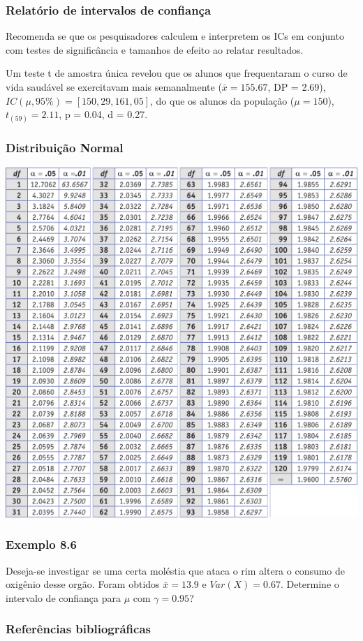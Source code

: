 \documentclass[11pt]{beamer}
\begin{document}
\begin{frame}
\frametitle{Relatório de intervalos de confiança}

Recomenda se que os pesquisadores calculem e interpretem os ICs em conjunto com testes de significância e tamanhos de efeito ao relatar resultados. 

Um teste t de amostra única revelou que os alunos que frequentaram o curso de vida saudável se exercitavam mais semanalmente (\(\bar{x} = 155.67\), DP = 2.69), \(IC(\mu, 95\%)= [150,29, 161,05]\), do que os alunos da população ($\mu = 150$), $t_{(59)} = 2.11$, p = 0.04, d = 0.27.

\end{frame}

\begin{frame}
\frametitle{Distribuição Normal}

\begin{center}\includegraphics[width=0.7\linewidth]{figs/tabela_t} \end{center}
\end{frame}


\begin{frame}
\frametitle{Exemplo 8.6}
Deseja-se investigar se uma certa moléstia que ataca o rim altera o consumo de oxigênio desse orgão. Foram obtidos \(\bar{x}=13.9\) e \(Var(X)=0.67\). Determine o intervalo de confiança para \(\mu\) com \(\gamma=0.95\)?
\vspace{1in}
\vspace{1in}

\end{frame}

\begin{frame}
\frametitle{Referências bibliográficas}
\printbibliography
\end{frame}
\end{document}
